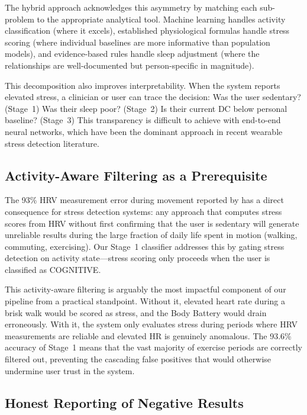 \documentclass[12pt,letterpaper]{article}
\begin{document}
The hybrid approach acknowledges this asymmetry by matching each sub-problem to the appropriate analytical tool. Machine learning handles activity classification (where it excels), established physiological formulas handle stress scoring (where individual baselines are more informative than population models), and evidence-based rules handle sleep adjustment (where the relationships are well-documented but person-specific in magnitude).

This decomposition also improves interpretability. When the system reports elevated stress, a clinician or user can trace the decision: Was the user sedentary? (Stage~1) Was their sleep poor? (Stage~2) Is their current DC below personal baseline? (Stage~3) This transparency is difficult to achieve with end-to-end neural networks, which have been the dominant approach in recent wearable stress detection literature.

\subsection{Activity-Aware Filtering as a Prerequisite}

The 93\% HRV measurement error during movement reported by \cite{bonneval2025hrv} has a direct consequence for stress detection systems: any approach that computes stress scores from HRV without first confirming that the user is sedentary will generate unreliable results during the large fraction of daily life spent in motion (walking, commuting, exercising). Our Stage~1 classifier addresses this by gating stress detection on activity state---stress scoring only proceeds when the user is classified as COGNITIVE.

This activity-aware filtering is arguably the most impactful component of our pipeline from a practical standpoint. Without it, elevated heart rate during a brisk walk would be scored as stress, and the Body Battery would drain erroneously. With it, the system only evaluates stress during periods where HRV measurements are reliable and elevated HR is genuinely anomalous. The 93.6\% accuracy of Stage~1 means that the vast majority of exercise periods are correctly filtered out, preventing the cascading false positives that would otherwise undermine user trust in the system.

\subsection{Honest Reporting of Negative Results}
\end{document}

